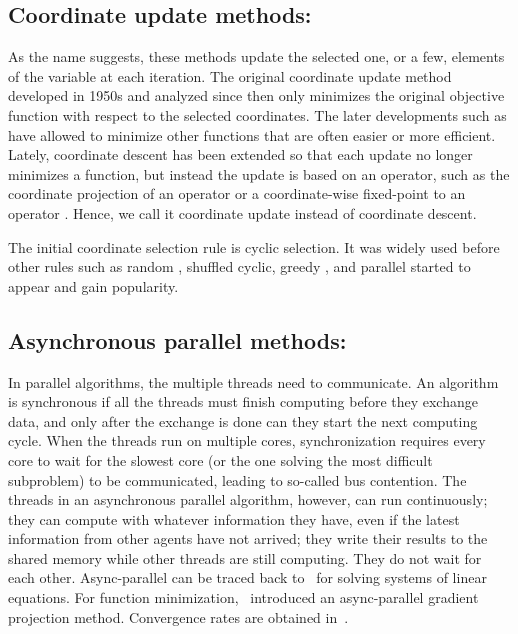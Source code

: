 \subsection*{Coordinate update methods:}
As the name suggests, these methods update the selected one, or a few, elements of the variable at each iteration. The original  coordinate update method \citep{Hildreth1957_quadratic,Warga1963_minimizing,SargentSebastian1973_convergence,LuoTseng1992_convergence} developed in 1950s and analyzed since then only minimizes the original objective function with respect to the selected coordinates. The later developments such as \citep{GrippoSciandrone2000_convergence,TsengYun2009_coordinate,TsengYun2009_blockcoordinate,XuYin2013_block,BolteSabachTeboulle2014_proximal} have allowed to minimize other functions that are often easier or more efficient. Lately, coordinate descent has been extended so that each update no longer minimizes a function, but instead the update is based on an operator, such as the coordinate projection of an operator or a coordinate-wise fixed-point to an operator \citep{CombettesPesquet2015_stochastic,BianchiHachemFranck2014_stochastic,PengXuYanYin2015_arock,PengWuXuYanYin2016_coordinate}. Hence, we call it coordinate update instead of coordinate descent.

The initial coordinate selection rule  is cyclic selection. It was widely used before other rules such as random \citep{Nesterov2012_efficiency,RichtarikTakac2014_iteration,LuXiao2015_complexity}, shuffled cyclic, greedy \citep{BertsekasBertsekas1999_nonlinear,LiOsher2009_coordinate,TsengYun2009_coordinate,PengYanYin2013_parallel,NutiniSchmidtLaradjiFriedlanderKoepke2015_coordinate}, and parallel \citep{BradleyKyrolaBicksonGuestrin2011_parallel,richtarik2016parallel} started to appear and gain popularity.


\subsection*{Asynchronous parallel methods:}

In  parallel algorithms, the multiple threads need to communicate. An algorithm is synchronous if all the  threads must finish computing before they exchange data, and only after the exchange is done can they start the next computing cycle. When the threads run on multiple cores, synchronization requires every core to wait for the slowest core
(or the one solving the most difficult subproblem) to be communicated,  leading to so-called  bus contention. The threads in an asynchronous parallel algorithm, however, can run continuously; they can compute with whatever information they have, even if the latest information from other agents
have not arrived; they write their results to the shared memory while other threads are still computing. They do not wait for each other. Async-parallel can be traced back to~\citep{chazan1969chaotic} for solving systems of linear equations.
For function minimization,~\citep{bertsekas1989parallel} introduced an async-parallel gradient projection method. Convergence rates are obtained in~\citep{tseng1991rate-asyn}.


